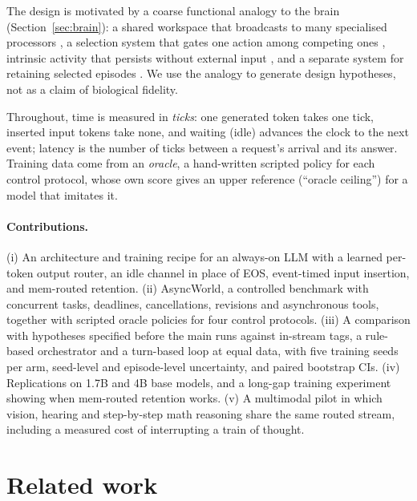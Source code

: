 \documentclass[10pt]{article}
\begin{document}
The design is motivated by a coarse functional analogy to the brain (Section~\ref{sec:brain}): a shared workspace that broadcasts to many specialised processors \citep{baars1988cognitive,dehaene1998neuronal}, a selection system that gates one action among competing ones \citep{mink1996basal,redgrave1999basal}, intrinsic activity that persists without external input \citep{raichle2001default}, and a separate system for retaining selected episodes \citep{mcclelland1995why}. We use the analogy to generate design hypotheses, not as a claim of biological fidelity.

Throughout, time is measured in \emph{ticks}: one generated token takes one tick, inserted input tokens take none, and waiting (idle) advances the clock to the next event; latency is the number of ticks between a request's arrival and its answer. Training data come from an \emph{oracle}, a hand-written scripted policy for each control protocol, whose own score gives an upper reference (``oracle ceiling'') for a model that imitates it.

\paragraph{Contributions.} (i) An architecture and training recipe for an always-on LLM with a learned per-token output router, an idle channel in place of EOS, event-timed input insertion, and mem-routed retention. (ii) AsyncWorld, a controlled benchmark with concurrent tasks, deadlines, cancellations, revisions and asynchronous tools, together with scripted oracle policies for four control protocols. (iii) A comparison with hypotheses specified before the main runs against in-stream tags, a rule-based orchestrator and a turn-based loop at equal data, with five training seeds per arm, seed-level and episode-level uncertainty, and paired bootstrap CIs. (iv) Replications on 1.7B and 4B base models, and a long-gap training experiment showing when mem-routed retention works. (v) A multimodal pilot in which vision, hearing and step-by-step math reasoning share the same routed stream, including a measured cost of interrupting a train of thought.

\section{Related work}\label{sec:related}
\end{document}
